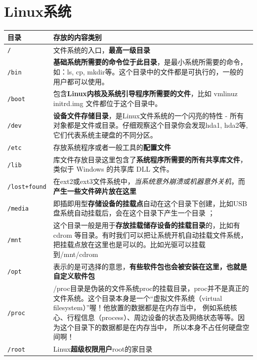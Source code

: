 \documentclass[UTF8,a4paper,12pt]{ctexbook}
\begin{document}
	\section{Linux系统} 
			\begin{table}[H]
				\caption{Linux 目录详解}
				\begin{longtable}{l|m{14cm}}
					\hline
					目录 	   	   & 存放的内容类别\\
					\hline
							\verb|/ |   		&	文件系统的入口，\textbf{最高一级目录}			\\ 
							\verb|/bin| 		&	\textbf{基础系统所需要的命令位于此目录}，是最小系统所需要的命令，如：ls, cp, mkdir等。这个目录中的文件都是可执行的，一般的用户都可以使用。			\\
							\verb|/boot|		&	包含\textbf{Linux内核及系统引导程序所需要的文件}，比如 vmlinuz initrd.img 文件都位于这个目录中。			\\
							\verb|/dev|		&	\textbf{设备文件存储目录}，是Linux文件系统的一个闪亮的特性 - 所有对象都是文件或目录。仔细观察这个目录你会发现hda1, hda2等, 它们代表系统主硬盘的不同分区。			\\
							\verb|/etc|		&	存放系统程序或者一般工具的\textbf{配置文件}			\\
							\verb|/lib|		&	库文件存放目录这里包含了\textbf{系统程序所需要的所有共享库文件}，类似于 Windows 的共享库 DLL 文件。			\\
							\verb|/lost+found|	&	在ext2或ext3文件系统中，\textit{当系统意外崩溃或机器意外关机}，而\textbf{产生一些文件碎片放在这里}			\\
							\verb|/media|		&	即插即用型\textbf{存储设备的挂载点}自动在这个目录下创建，比如USB盘系统自动挂载后，会在这个目录下产生一个目录 ；\\
							\verb|/mnt|		&	这个目录一般是用于\textbf{存放挂载储存设备的挂载目录}的，比如有cdrom 等目录。有时我们可以把让系统开机自动挂载文件系统，把挂载点放在这里也是可以的。比如光驱可以挂载到/mnt/cdrom 			\\
							\verb|/opt|		&	表示的是可选择的意思，\textbf{有些软件包也会被安装在这里，也就是自定义软件包}\\
							\verb|/proc|		&	/proc目录是伪装的文件系统proc的挂载目录，proc并不是真正的文件系统。这个目录本身是一个“虚拟文件系统（virtual filesystem）”喔！他放置的数据都是在内存当中， 例如系统核心、行程信息（process）、周边设备的状态及网络状态等等。因为这个目录下的数据都是在内存当中， 所以本身不占任何硬盘空间啊！\\
							\verb|/root|		&	Linux\textbf{超级权限用户}root的家目录			\\

\end{longtable}
\end{table}
\end{document}
